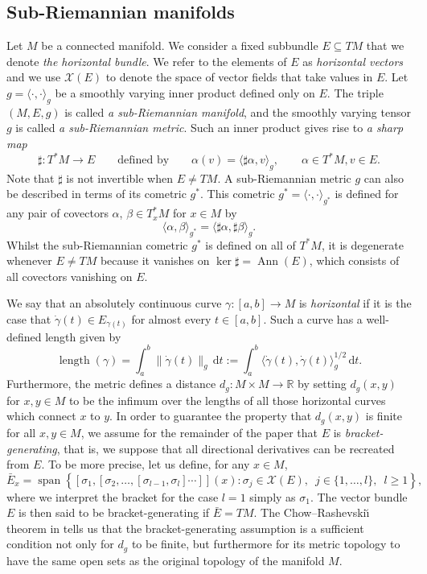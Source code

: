 \documentclass[10pt]{amsart}
\theoremstyle{remark}
\newcommand{\calX}{\mathcal{X}}
\DeclareMathOperator{\Ann}{Ann}
\DeclareMathOperator{\spn}{span}
\DeclareMathOperator{\length}{length}
\newcommand{\R}{\mathbb{R}}
\newcommand{\dd}{\,{\mathrm d}}
\numberwithin{equation}{section}
\begin{document}
\subsection{Sub-Riemannian manifolds}
Let $M$ be a connected manifold. We consider a fixed subbundle $E \subseteq TM$ that we denote \emph{the horizontal bundle}.
We refer to the elements of $E$ as \emph{horizontal vectors} and we use $\calX(E)$ to denote the space of vector fields that take values in $E$. Let $g = \langle \cdot , \cdot \rangle_g$ be a smoothly varying inner product defined only on $E$. The triple $(M, E,g)$ is called \emph{a sub-Riemannian manifold}, and the smoothly varying tensor $g$ is called \emph{a sub-Riemannian metric}. Such an inner product gives rise to \emph{a sharp map}
$$\sharp\colon T^*M \to E \qquad \text{defined by} \qquad \alpha(v) = \langle \sharp \alpha, v\rangle_g, \qquad \alpha \in T^*M, v \in E.$$
Note that $\sharp$ is not invertible when $E \neq TM$. A sub-Riemannian metric $g$ can also be described in terms of its cometric $g^*$.
This cometric $g^*=\langle \cdot , \cdot \rangle_{g^*}$ is defined for any pair of covectors $\alpha$, $\beta \in T_x^*M$ for $x \in M$ by
$$\langle \alpha, \beta \rangle_{g^*} = \langle \sharp \alpha, \sharp \beta \rangle_{g}.$$
Whilst the sub-Riemannian cometric $g^*$ is defined on all of $T^*M$, it is degenerate whenever $E \neq TM$ because it vanishes on $\ker \sharp = \Ann(E)$, which consists of all covectors vanishing on $E$.

We say that an absolutely continuous curve $\gamma\colon[a,b]\to M$ is \emph{horizontal} if it is the case that $\dot \gamma(t) \in E_{\gamma(t)}$ for almost every $t \in [a,b]$. Such a curve has a well-defined length given by
$$\length(\gamma) = \int_a^b \| \dot \gamma(t)  \|_g \dd t :=\int_a^b \langle \dot \gamma(t) , \dot \gamma(t) \rangle_g^{1/2} \dd t.$$
Furthermore, the metric defines a distance $d_g\colon M\times M\to\R$ by setting $d_g(x,y)$ for $x,y\in M$ to be the infimum over the lengths of all those horizontal curves which connect $x$ to $y$. In order to guarantee the property that $d_g(x,y)$ is finite for all $x,y\in M$, we assume for the remainder of the paper that $E$ is \emph{bracket-generating}, that is, we suppose that all directional derivatives can be recreated from $E$. To be more precise, let us define, for any $x\in M$,
$$\bar{E}_x = \spn \left\{ [\sigma_1,[\sigma_2,\dots, [\sigma_{l-1},\sigma_{l}]\cdots ]] (x) : \sigma_j \in \calX(E),\enspace j\in\{1,\dots, l\},\enspace l\geq 1 \right\},$$
where we interpret the bracket for the case $l=1$ simply as $\sigma_1$. The vector bundle $E$ is then said to be bracket-generating if $\bar{E} = TM$. The Chow--Rashevski{\u\i} theorem in \cite{Cho39,Ras38} tells us that the bracket-generating assumption is a sufficient condition not only for $d_g$ to be finite, but furthermore for its metric topology to have the same open sets as the original topology of the manifold $M$.
\end{document}
